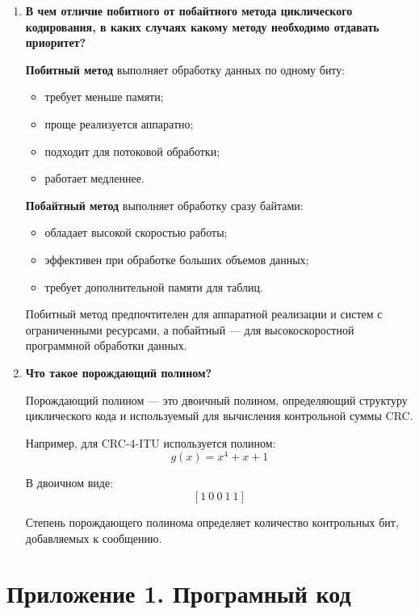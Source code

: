 \documentclass[a4paper, 14pt]{article}
\begin{document}
\begin{enumerate}
    CRC широко используется благодаря высокой надежности обнаружения ошибок и простоте реализации.

  \item \textbf{В чем отличие побитного от побайтного метода циклического кодирования, в каких случаях какому методу необходимо отдавать приоритет?}

    \textbf{Побитный метод} выполняет обработку данных по одному биту:
    \begin{itemize}
      \item требует меньше памяти;
      \item проще реализуется аппаратно;
      \item подходит для потоковой обработки;
      \item работает медленнее.
    \end{itemize}

    \textbf{Побайтный метод} выполняет обработку сразу байтами:
    \begin{itemize}
      \item обладает высокой скоростью работы;
      \item эффективен при обработке больших объемов данных;
      \item требует дополнительной памяти для таблиц.
    \end{itemize}

    Побитный метод предпочтителен для аппаратной реализации и систем с ограниченными ресурсами, а побайтный --- для высокоскоростной программной обработки данных.

  \item \textbf{Что такое порождающий полином?}

    Порождающий полином --- это двоичный полином, определяющий структуру циклического кода и используемый для вычисления контрольной суммы CRC.

    Например, для CRC-4-ITU используется полином:
    \[
      g(x) = x^4 + x + 1
    \]

    В двоичном виде:
    \[
      [1\ 0\ 0\ 1\ 1]
    \]

    Степень порождающего полинома определяет количество контрольных бит, добавляемых к сообщению.

\end{enumerate}

\newpage
\section*{Приложение 1. Програмный код}
\end{document}

